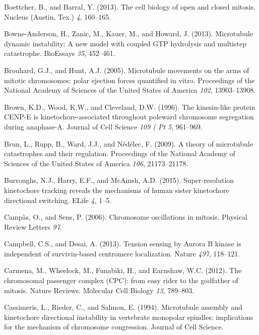 \documentclass[12pt,a4paper,twoside,openright]{book}
\begin{document}
\hypertarget{ref-Boettcher2013}{}
Boettcher, B., and Barral, Y. (2013). The cell biology of open and
closed mitosis. Nucleus (Austin, Tex.) \emph{4}, 160--165.

\hypertarget{ref-Bowne-Anderson2013}{}
Bowne-Anderson, H., Zanic, M., Kauer, M., and Howard, J. (2013).
Microtubule dynamic instability: A new model with coupled GTP hydrolysis
and multistep catastrophe. BioEssays \emph{35}, 452--461.

\hypertarget{ref-Brouhard2005}{}
Brouhard, G.J., and Hunt, A.J. (2005). Microtubule movements on the arms
of mitotic chromosomes: polar ejection forces quantified in vitro.
Proceedings of the National Academy of Sciences of the United States of
America \emph{102}, 13903--13908.

\hypertarget{ref-Brown1996}{}
Brown, K.D., Wood, K.W., and Cleveland, D.W. (1996). The kinesin-like
protein CENP-E is kinetochore-associated throughout poleward chromosome
segregation during anaphase-A. Journal of Cell Science \emph{109 ( Pt
5}, 961--969.

\hypertarget{ref-Brun2009}{}
Brun, L., Rupp, B., Ward, J.J., and Nédélec, F. (2009). A theory of
microtubule catastrophes and their regulation. Proceedings of the
National Academy of Sciences of the United States of America \emph{106},
21173--21178.

\hypertarget{ref-Burroughs2015}{}
Burroughs, N.J., Harry, E.F., and McAinsh, A.D. (2015). Super-resolution
kinetochore tracking reveals the mechanisms of human sister kinetochore
directional switching. ELife \emph{4}, 1--5.

\hypertarget{ref-Campas2006}{}
Campàs, O., and Sens, P. (2006). Chromosome oscillations in mitosis.
Physical Review Letters \emph{97}.

\hypertarget{ref-Campbell2013a}{}
Campbell, C.S., and Desai, A. (2013). Tension sensing by Aurora B kinase
is independent of survivin-based centromere localization. Nature
\emph{497}, 118--121.

\hypertarget{ref-Carmena2012a}{}
Carmena, M., Wheelock, M., Funabiki, H., and Earnshaw, W.C. (2012). The
chromosomal passenger complex (CPC): from easy rider to the godfather of
mitosis. Nature Reviews. Molecular Cell Biology \emph{13}, 789--803.

\hypertarget{ref-Cassimeris1994}{}
Cassimeris, L., Rieder, C., and Salmon, E. (1994). Microtubule assembly
and kinetochore directional instability in vertebrate monopolar
spindles: implications for the mechanism of chromosome congression.
Journal of Cell Science.
\end{document}
